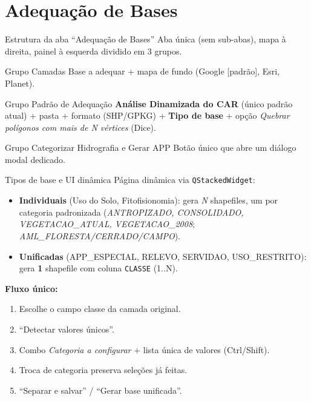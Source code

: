 \documentclass[10pt,aspectratio=169]{beamer}
\begin{document}
\section{Adequação de Bases}
\begin{frame}{Estrutura da aba ``Adequação de Bases''}
  Aba única (sem sub-abas), mapa à direita, painel à esquerda dividido em 3 grupos.
  \begin{block}{Grupo Camadas}
    Base a adequar + mapa de fundo (Google [padrão], Esri, Planet).
  \end{block}
  \begin{block}{Grupo Padrão de Adequação}
    \textbf{Análise Dinamizada do CAR} (único padrão atual) + pasta + formato (SHP/GPKG) + \textbf{Tipo de base} + opção \emph{Quebrar polígonos com mais de N vértices} (Dice).
  \end{block}
  \begin{block}{Grupo Categorizar Hidrografia e Gerar APP}
    Botão único que abre um diálogo modal dedicado.
  \end{block}
\end{frame}

\begin{frame}{Tipos de base e UI dinâmica}
  Página dinâmica via \texttt{QStackedWidget}:
  \begin{itemize}
    \item \textbf{Individuais} (Uso do Solo, Fitofisionomia): gera \emph{N} shapefiles, um por categoria padronizada (\emph{ANTROPIZADO, CONSOLIDADO, VEGETACAO\_ATUAL, VEGETACAO\_2008}; \emph{AML\_FLORESTA/CERRADO/CAMPO}).
    \item \textbf{Unificadas} (APP\_ESPECIAL, RELEVO, SERVIDAO, USO\_RESTRITO): gera \textbf{1} shapefile com coluna \texttt{CLASSE} (1..N).
  \end{itemize}
  \textbf{Fluxo único:}
  \begin{enumerate}
    \item Escolhe o campo classe da camada original.
    \item ``Detectar valores únicos''.
    \item Combo \emph{Categoria a configurar} + lista única de valores (Ctrl/Shift).
    \item Troca de categoria preserva seleções já feitas.
    \item ``Separar e salvar'' / ``Gerar base unificada''.
  \end{enumerate}
\end{frame}
\end{document}
